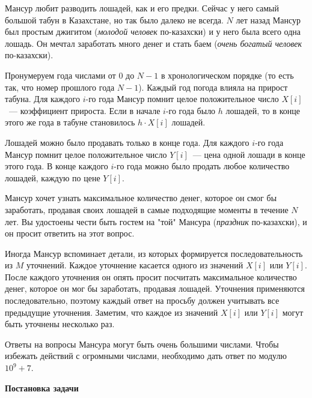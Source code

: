 Мансур любит разводить лошадей, как и его предки. Сейчас у него самый большой табун в
Казахстане, но так было далеко не всегда. $N$ лет назад Мансур был простым джигитом
(\textit{молодой человек} по-казахски) и у него была всего одна лошадь. Он мечтал заработать много
денег и стать баем (\textit{очень богатый человек} по-казахски).

Пронумеруем года числами от $0$ до $N - 1$ в хронологическом порядке (то есть так, что номер
прошлого года $N-1$). Каждый год погода влияла на прирост табуна. Для каждого $i$-го года
Мансур помнит целое положительное число $X[i]$~--- коэффициент прироста. Если в начале $i$-го
года было $h$ лошадей, то в конце этого же года в табуне становилось $h \cdot X[i]$ лошадей.

Лошадей можно было продавать только в конце года. Для каждого $i$-го года Мансур помнит
целое положительное число $Y[i]$~--- цена одной лошади в конце этого года. В конце каждого $i$-го года можно было продать любое количество лошадей, каждую по цене $Y[i]$.

Мансур хочет узнать максимальное количество денег, которое он смог бы заработать,
продавая своих лошадей в самые подходящие моменты в течение $N$ лет. Вы удостоены чести
быть гостем на "той" Мансура (\textit{праздник} по-казахски), и он просит ответить на этот вопрос.

Иногда Мансур вспоминает детали, из которых формируется последовательность из
$M$ уточнений. Каждое уточнение касается одного из значений $X[i]$ или $Y[i]$. После каждого
уточнения он опять просит посчитать максимальное количество денег, которое он мог бы
заработать, продавая лошадей. Уточнения применяются последовательно, поэтому каждый
ответ на просьбу должен учитывать все предыдущие уточнения. Заметим, что каждое из
значений $X[i]$ или $Y[i]$ могут быть уточнены несколько раз.

Ответы на вопросы Мансура могут быть очень большими числами. Чтобы избежать действий
с огромными числами, необходимо дать ответ по модулю $10^9 + 7$.

\textbf{Постановка задачи}


